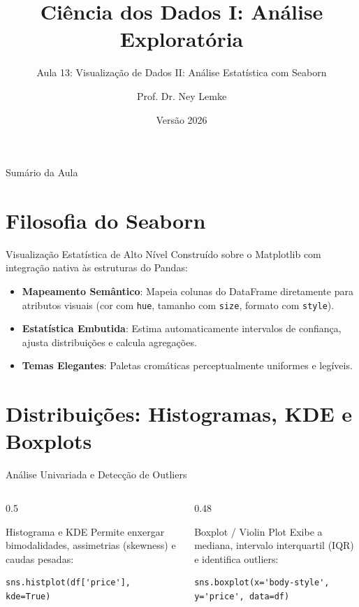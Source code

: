 \documentclass[aspectratio=169, 10pt]{beamer}
\title[Aula 13 - Seaborn Estatístico]{Ciência dos Dados I: Análise Exploratória}
\subtitle{Aula 13: Visualização de Dados II: Análise Estatística com Seaborn}
\author{Prof. Dr. Ney Lemke}
\institute{UNESP -- Instituto de Biociências de Botucatu}
\date{Versão 2026}
\begin{document}
\frame{\titlepage}

\begin{frame}{Sumário da Aula}
  \tableofcontents
\end{frame}

\section{Filosofia do Seaborn}

\begin{frame}{Visualização Estatística de Alto Nível}
  Construído sobre o Matplotlib com integração nativa às estruturas do Pandas:
  \begin{itemize}
    \item \textbf{Mapeamento Semântico}: Mapeia colunas do DataFrame diretamente para atributos visuais (cor com \texttt{hue}, tamanho com \texttt{size}, formato com \texttt{style}).
    \item \textbf{Estatística Embutida}: Estima automaticamente intervalos de confiança, ajusta distribuições e calcula agregações.
    \item \textbf{Temas Elegantes}: Paletas cromáticas perceptualmente uniformes e legíveis.
  \end{itemize}
\end{frame}

\section{Distribuições: Histogramas, KDE e Boxplots}

\begin{frame}[fragile]{Análise Univariada e Detecção de Outliers}
  \begin{columns}
    \begin{column}{0.5\textwidth}
      \begin{block}{Histograma e KDE}
        Permite enxergar bimodalidades, assimetrias (skewness) e caudas pesadas:
      \end{block}
      \begin{lstlisting}
sns.histplot(df['price'], kde=True)
      \end{lstlisting}
    \end{column}
    \begin{column}{0.48\textwidth}
      \begin{block}{Boxplot / Violin Plot}
        Exibe a mediana, intervalo interquartil (IQR) e identifica outliers:
      \end{block}
      \begin{lstlisting}
sns.boxplot(x='body-style', y='price', data=df)
      \end{lstlisting}
    \end{column}
  \end{columns}
\end{frame}
\end{document}
